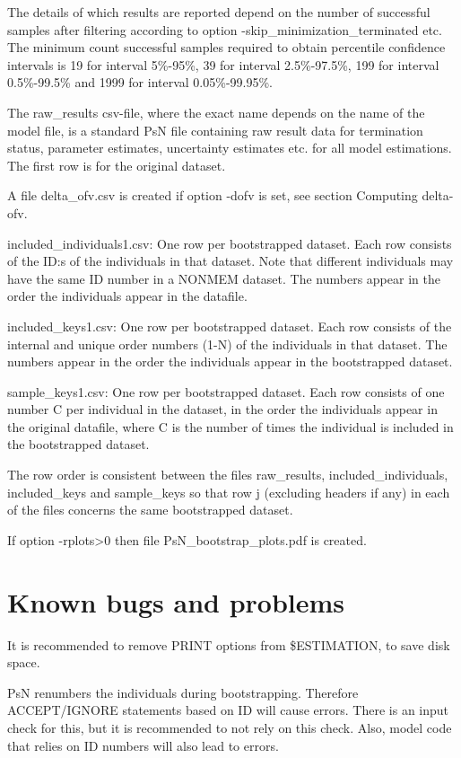 The details of which results are reported depend on the number of successful samples after filtering according to
option -skip\_minimization\_terminated etc. The minimum count successful samples required to obtain
percentile confidence intervals is %
19 for interval 5\%-95\%, 39 for interval 2.5\%-97.5\%, 199 for interval 0.5\%-99.5\% and 1999 for interval 0.05\%-99.95\%.

The raw\_results csv-file, where the exact name depends on the name of the model file, 
is a standard PsN file containing raw result data for termination status, parameter estimates, uncertainty estimates etc. for all model estimations. 
The first row is for the original dataset.

A file delta\_ofv.csv is created if option -dofv is set, see section Computing delta-ofv.

included\_individuals1.csv: One row per bootstrapped dataset. Each row consists of the ID:s of the individuals in that dataset. Note that different individuals may have the same ID number in a NONMEM dataset. The numbers appear in the order the individuals appear in the datafile.

included\_keys1.csv: One row per bootstrapped dataset. Each row consists of the internal and unique order numbers (1-N) of the individuals in that dataset. The numbers appear in the order the individuals appear in the bootstrapped dataset. 

sample\_keys1.csv:  One row per bootstrapped dataset. Each row consists of one number C per individual in the dataset, in the order the individuals appear in the original datafile, where C is the number of times the individual is included in the bootstrapped dataset. 

The row order is consistent between the files raw\_results, included\_individuals, included\_keys and sample\_keys so that row j (excluding headers if any) in each of the files concerns the same bootstrapped dataset.

If option -rplots>0 then file PsN\_bootstrap\_plots.pdf is created.

\section{Known bugs and problems}

It is recommended to remove PRINT options from \$ESTIMATION, to save disk space.

PsN renumbers the individuals during bootstrapping. Therefore ACCEPT/IGNORE statements based on ID will cause errors. 
There is an input check for this, but it is recommended to not rely on this check. Also, model code that relies on ID numbers will also lead to
errors.

